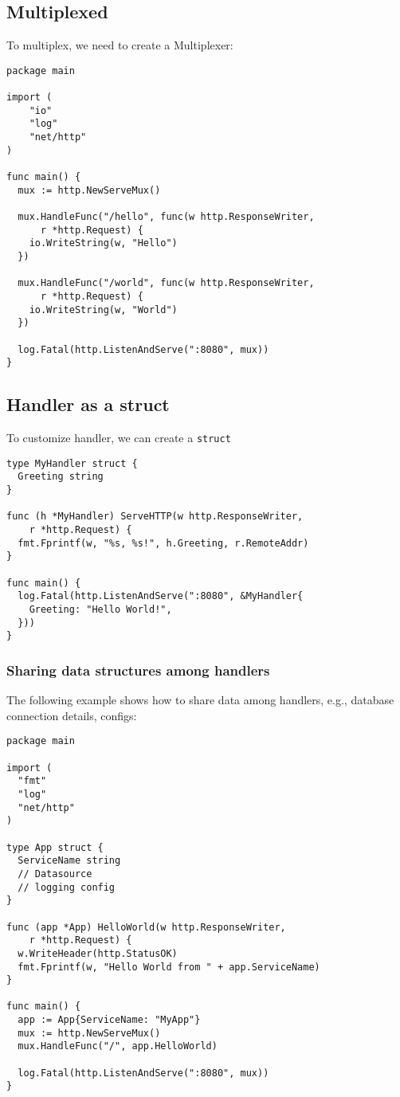 \documentclass[11pt, letterpaper]{article}
\begin{document}
\subsection{Multiplexed}

To multiplex, we need to create a Multiplexer:

\begin{verbatim}
package main

import (
    "io"
    "log"
    "net/http"
)

func main() {
  mux := http.NewServeMux()

  mux.HandleFunc("/hello", func(w http.ResponseWriter,
      r *http.Request) {
    io.WriteString(w, "Hello")
  })
  
  mux.HandleFunc("/world", func(w http.ResponseWriter,
      r *http.Request) {
    io.WriteString(w, "World")
  })

  log.Fatal(http.ListenAndServe(":8080", mux))
}
\end{verbatim}


\subsection{Handler as a struct}

To customize handler, we can create a \verb|struct|

\begin{verbatim}
type MyHandler struct {
  Greeting string
}

func (h *MyHandler) ServeHTTP(w http.ResponseWriter,
    r *http.Request) {
  fmt.Fprintf(w, "%s, %s!", h.Greeting, r.RemoteAddr)
}

func main() {
  log.Fatal(http.ListenAndServe(":8080", &MyHandler{
    Greeting: "Hello World!",
  }))
}
\end{verbatim}

\subsubsection{Sharing data structures among handlers}

The following example shows how to share data among handlers, e.g., database connection details, configs:

\begin{verbatim}
package main

import (
  "fmt"
  "log"
  "net/http"
)

type App struct {
  ServiceName string
  // Datasource
  // logging config
}

func (app *App) HelloWorld(w http.ResponseWriter,
    r *http.Request) {
  w.WriteHeader(http.StatusOK)
  fmt.Fprintf(w, "Hello World from " + app.ServiceName)
}

func main() {
  app := App{ServiceName: "MyApp"}
  mux := http.NewServeMux()
  mux.HandleFunc("/", app.HelloWorld)

  log.Fatal(http.ListenAndServe(":8080", mux))
}
\end{verbatim}
\end{document}
